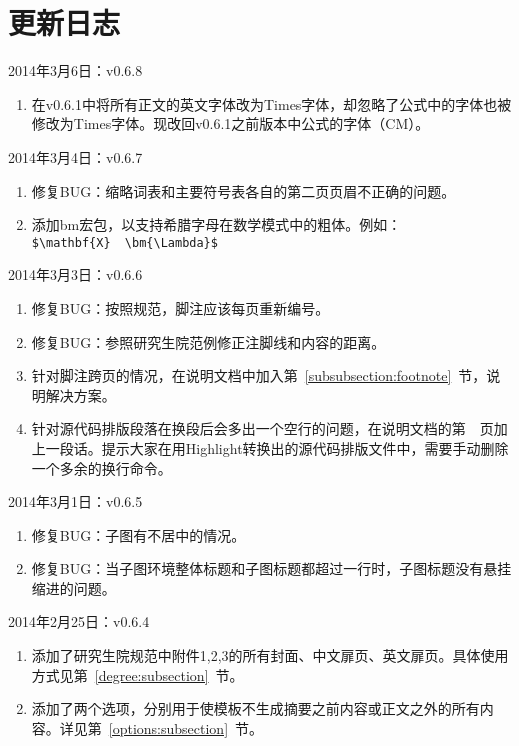 
\chapter{更新日志}
\noindent
2014年3月6日：v0.6.8
\begin{enumerate}
\item 在v0.6.1中将所有正文的英文字体改为Times字体，却忽略了公式中的字体也被修改为Times字体。现改回v0.6.1之前版本中公式的字体（CM）。
\end{enumerate}

\noindent
2014年3月4日：v0.6.7
\begin{enumerate}
\item 修复BUG：缩略词表和主要符号表各自的第二页页眉不正确的问题。
\item 添加bm宏包，以支持希腊字母在数学模式中的粗体。例如：\\ \verb|$\mathbf{X}  \bm{\Lambda}$|
\end{enumerate}

\noindent
2014年3月3日：v0.6.6
\begin{enumerate}
\item 修复BUG：按照规范，脚注应该每页重新编号。
\item 修复BUG：参照研究生院范例修正注脚线和内容的距离。
\item 针对脚注跨页的情况，在说明文档中加入第~\ref{subsubsection:footnote}~节，说明解决方案。
\item 针对源代码排版段落在换段后会多出一个空行的问题，在说明文档的第~\pageref{par:scrextraline}~页加上一段话。提示大家在用Highlight转换出的源代码排版文件中，需要手动删除一个多余的换行命令。
\end{enumerate}

\noindent
2014年3月1日：v0.6.5
\begin{enumerate}
\item 修复BUG：子图有不居中的情况。
\item 修复BUG：当子图环境整体标题和子图标题都超过一行时，子图标题没有悬挂缩进的问题。
\end{enumerate}

\noindent
2014年2月25日：v0.6.4
\begin{enumerate}
\item 添加了研究生院规范中附件1,2,3的所有封面、中文扉页、英文扉页。具体使用方式见第~\ref{degree:subsection}~节。
\item 添加了两个选项，分别用于使模板不生成摘要之前内容或正文之外的所有内容。详见第~\ref{options:subsection}~节。

\end{enumerate}

